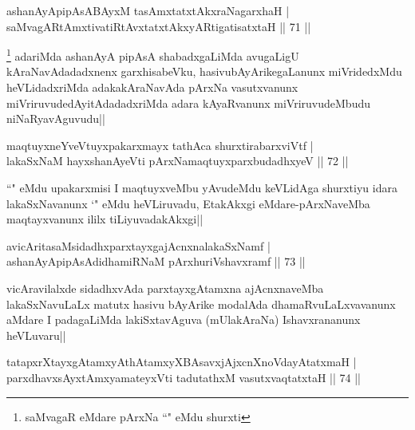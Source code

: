 \begin{shl}
ashanAyApipAsABAyxM tasAmxtatxtAkxraNagarxhaH |\\
saMvagARtAmxtivatiRtAvxtatxtAkxyARtigatisatxtaH \hfill || 71 ||
\end{shl}

\begin{artha}
\footnote[1]{saMvagaR eMdare pArxNa ``\stext " eMdu shurxti} adariMda ashanAyA pipAsA shabadxgaLiMda avugaLigU kAraNavAdadadxnenx garxhisabeVku, hasivubAyArikegaLanunx miVridedxMdu heVLidadxriMda adakakAraNavAda pArxNa vasutxvanunx miVriruvudedAyitAdadadxriMda adara kAyaRvanunx miVriruvudeMbudu niNaRyavAguvudu||
\end{artha}


\begin{shl}
maqtuyxneYveVtuyxpakarxmayx tathAca shurxtirabarxviVtf |\\
lakaSxNaM hayxshanAyeVti pArxNamaqtuyxparxbudadhxyeV \hfill || 72 ||
\end{shl}

\begin{artha}
``\stext " eMdu upakarxmisi I maqtuyxveMbu yAvudeMdu keVLidAga shurxtiyu idara lakaSxNavanunx `\stext " eMdu heVLiruvadu, EtakAkxgi eMdare-pArxNaveMba maqtayxvanunx ililx tiLiyuvadakAkxgi||
\end{artha}


\begin{shl}
avicAritasaMsidadhxparxtayxgajAcnxnalakaSxNamf |\\
ashanAyApipAsAdidhamiRNaM pArxhuriVshavxramf \hfill || 73 ||
\end{shl}

\begin{artha}
vicAravilalxde sidadhxvAda parxtayxgAtamxna ajAcnxnaveMba lakaSxNavuLaLx matutx hasivu bAyArike modalAda dhamaRvuLaLxvavanunx aMdare I padagaLiMda lakiSxtavAguva (mUlakAraNa) Ishavxrananunx heVLuvaru||
\end{artha}

\begin{shl}
tatapxrXtayxgAtamxyAthAtamxyXBAsavxjAjxcnXnoVdayAtatxmaH |\\
parxdhavxsAyx\s \s tAmx\s yamateyxVti tadutathxM vasutxvaqtatxtaH \hfill || 74 ||
\end{shl}


